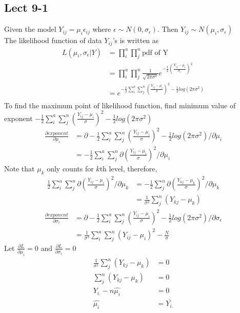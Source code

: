 \documentclass[11pt,letterpaper]{article}
\begin{document}
\subsection*{Lect 9-1}
\noindent Given the model $Y_{ij} = \mu_i \epsilon_{ij}$ where $\epsilon \sim N(0, \sigma_{\epsilon})$. Then $Y_{ij} \sim N(\mu_i, \sigma_{\epsilon})$ \\

The likelihood function of data $Y_{ij}$'s is written as 
\begin{align*}
L(\mu_i, \sigma_{\epsilon} | Y) &= \prod_i^a \prod_j^n \text{pdf of Y} \\
&= \prod_i^a \prod_j^n \frac{1}{\sqrt{2 \pi \sigma^2}} e^{-\frac{1}{2} (\frac{Y_{ij} - \mu_i}{\sigma_{\epsilon}})^2} \\
&= e^{-\frac{1}{2} \sum_i^a \sum_j^n (\frac{Y_{ij} - \mu_i}{\sigma})^2 - \frac{1}{2} log(2 \pi \sigma^2)} \\
\end{align*}
\noindent To find the maximum point of likelihood function, find minimum value of exponent $-\frac{1}{2} \sum_i^a \sum_j^n (\frac{Y_{ij} - \mu_i}{\sigma})^2 - \frac{1}{2} log(2 \pi \sigma^2)$  
\begin{align*}
\frac{\partial exponent}{\partial \mu_i} &= \partial -\frac{1}{2} \sum_i^a \sum_j^n (\frac{Y_{ij} - \mu_i}{\sigma})^2 - \frac{1}{2} log(2 \pi \sigma^2) / \partial \mu_i \\
&= -\frac{1}{2} \sum_i^a \sum_j^n \partial (\frac{Y_{ij} - \mu_i}{\sigma})^2 / \partial \mu_i
\end{align*}
Note that $\mu_k$ only counts for $k$th level, therefore, 
\begin{align*}
\frac{1}{2} \sum_i^a \sum_j^n \partial (\frac{Y_{ij} - \mu_i}{\sigma})^2 / \partial \mu_k &= -\frac{1}{2} \sum_j^n \partial (\frac{Y_{kj} - \mu_k}{\sigma})^2 / \partial \mu_k \\
&= \frac{1}{\sigma^2} \sum_j^n (Y_{kj} - \mu_k)
\end{align*}
\begin{align*}
\frac{\partial exponent}{\partial \sigma_{\epsilon}} &= \partial -\frac{1}{2} \sum_i^a \sum_j^n (\frac{Y_{ij} - \mu_i}{\sigma})^2 - \frac{1}{2} log(2 \pi \sigma^2) / \partial \sigma_{\epsilon} \\
&= \frac{1}{\sigma^3} \sum_i^a \sum_j^n (Y_{ij} - \mu_i)^2 - \frac{N}{\sigma}
\end{align*}
\noindent Let $\frac{\partial L}{\partial \mu_i} = 0$ and $\frac{\partial L}{\partial \sigma_{\epsilon}}  = 0$
\begin{align*}
\frac{1}{\sigma^2} \sum_j^n (Y_{kj} - \mu_k) &= 0 \\
\sum_j^n (Y_{kj} - \mu_k)  &= 0 \\
Y_{i.} - n \hat{\mu_i} &= 0 \\
\hat{\mu_i} &= \bar{Y_{i.}}
\end{align*}
\end{document}
